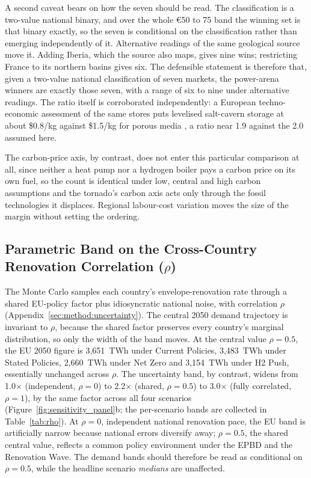 A second caveat bears on how the seven should be read. The classification is a two-value
national binary, and over the whole \euro{}50 to 75 band the winning set is that binary
exactly, so the seven is conditional on the classification rather than emerging
independently of it. Alternative readings of the same geological source move it. Adding
Iberia, which the source also maps, gives nine wins; restricting France to its northern
basins gives six. The defensible statement is therefore that, given a two-value national
classification of seven markets, the power-arena winners are exactly those seven, with a
range of six to nine under alternative readings. The ratio itself is corroborated
independently: a European techno-economic assessment of the same stores puts levelised
salt-cavern storage at about \$0.8/kg against \$1.5/kg for porous media
\citep{Talukdar2024UHSEurope}, a ratio near 1.9 against the 2.0 assumed here.

The carbon-price axis, by contrast, does not enter this particular
comparison at all, since neither a heat pump nor a hydrogen boiler pays a carbon price
on its own fuel, so the count is identical under low, central and high carbon
assumptions and the tornado's carbon axis acts only through the fossil technologies it
displaces. Regional labour-cost variation moves the size of the margin without setting
the ordering.

\subsection{Parametric Band on the Cross-Country Renovation Correlation ($\rho$)}
\label{sec:sensitivity:rho}

The Monte Carlo samples each country's envelope-renovation rate through a shared
EU-policy factor plus idiosyncratic national noise, with correlation $\rho$
(Appendix~\ref{sec:method:uncertainty}). The central 2050 demand trajectory is
invariant to $\rho$, because the shared factor preserves every country's marginal
distribution, so only the width of the band moves. At the central value
$\rho=0.5$, the EU 2050 figure is 3,651~TWh under Current Policies,
3,483~TWh under Stated Policies, 2,660~TWh under Net Zero and 3,154~TWh under H2
Push, essentially unchanged across $\rho$. The uncertainty band, by contrast,
widens
from 1.0$\times$ (independent, $\rho=0$) to 2.2$\times$ (shared, $\rho=0.5$) to
3.0$\times$ (fully correlated, $\rho=1$), by the same factor across all four
scenarios (Figure~\ref{fig:sensitivity_panel}b; the per-scenario bands are
collected in Table~\ref{tab:rho}). At $\rho=0$, independent national renovation
pace, the EU band is artificially narrow because national errors diversify away;
$\rho=0.5$, the shared central value, reflects a common policy environment under
the EPBD and the Renovation Wave. The demand bands should therefore be read as
conditional on $\rho=0.5$, while the headline scenario \emph{medians} are
unaffected.

